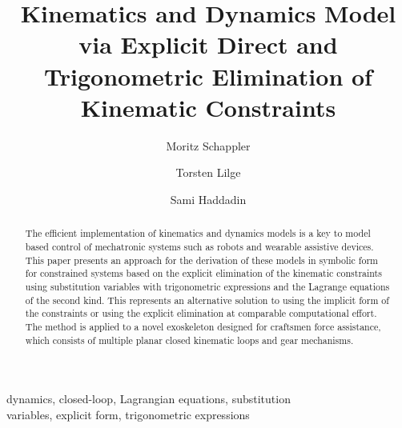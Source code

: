 \documentclass{svproc}
\begin{document}
    
\mainmatter
%
\title{Kinematics and Dynamics Model via Explicit Direct and Trigonometric Elimination of Kinematic Constraints}
%
%
\author{Moritz Schappler \and Torsten Lilge \and Sami Haddadin}
%
%
%
\maketitle              %


\begin{abstract}

The efficient implementation of kinematics and dynamics models is a key to model based control of mechatronic systems such as robots and wearable assistive devices.
This paper presents an approach for the derivation of these models in symbolic form for constrained systems based on the explicit elimination of the kinematic constraints using substitution variables with trigonometric expressions and the Lagrange equations of the second kind.
This represents an alternative solution to using the implicit form of the constraints or using the explicit elimination at comparable computational effort.
%
The method is applied to a novel exoskeleton designed for craftsmen force assistance, which consists of multiple planar closed kinematic loops and gear mechanisms.
\end{abstract}


\begin{keywords}
dynamics, closed-loop, Lagrangian equations, substitution \\ variables, explicit form, trigonometric expressions
\end{keywords}
\end{document}
